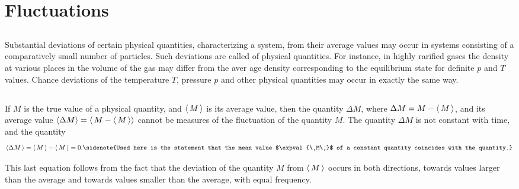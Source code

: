 \section{Fluctuations}
\label{sec-11.6}

\subsection{}\label{11.6.1} Substantial deviations of certain physical quantities, characterizing a system, from their average values may occur in systems consisting of a comparatively small number of particles. Such deviations are called  of physical quantities. For instance, in highly rarified gases the density at var­ious places in the volume of the gas may differ from the aver­ age density corresponding to the equilibrium state for definite $p$ and $T$ values. Chance deviations of the temperature $T$, pressure $p$ and other physical quantities may occur in exactly the same way.

\subsection{}\label{11.6.2} If $M$ is the true value of a physical quantity, and $\expval{\,M\,}$ is its average value, then the quantity $\Delta M$, where $\Delta M = M - \expval{\,M\,}$, and its average value $\expval{\Delta M} = \expval{\,M - \expval{\,M\,}}$ cannot be measures of the fluctuation of the quantity $M$. The quantity $\Delta M$ is not constant with time, and the quantity
\begin{equation*}%
\expval{\Delta M\,} = \expval{\,M\,} - \expval{\,M\,} = 0.\sidenote{Used here is the statement that the mean value $\expval{\,M\,}$ of a constant quantity coincides with the quantity.}
\end{equation*}

This last equation follows from the fact that the deviation of the quantity $M$ from $\expval{\,M\,}$ occurs in both directions, towards values larger than the average and towards values smaller than the average, with equal frequency.

